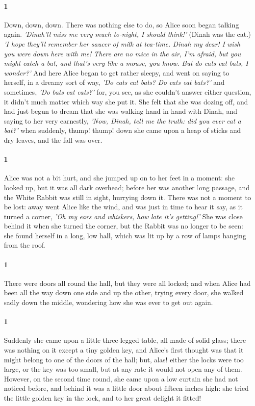 \documentclass[12pt]{article}
\begin{document}
\paragraph{1} Down, down, down. There was nothing else to do, so Alice soon began
talking again. \textit{'Dinah'll miss me very much to-night, I should think!'}
(Dinah was the cat.) \textit{'I hope they'll remember her saucer of milk at
tea-time. Dinah my dear! I wish you were down here with me! There are no
mice in the air, I'm afraid, but you might catch a bat, and that's very
like a mouse, you know. But do cats eat bats, I wonder?'} And here Alice
began to get rather sleepy, and went on saying to herself, in a dreamy
sort of way, \textit{'Do cats eat bats? Do cats eat bats?'} and sometimes, \textit{'Do
bats eat cats?'} for, you see, as she couldn't answer either question,
it didn't much matter which way she put it. She felt that she was dozing
off, and had just begun to dream that she was walking hand in hand with
Dinah, and saying to her very earnestly, \textit{'Now, Dinah, tell me the truth:
did you ever eat a bat?'} when suddenly, thump! thump! down she came upon
a heap of sticks and dry leaves, and the fall was over.


\paragraph{1} Alice was not a bit hurt, and she jumped up on to her feet in a moment:
she looked up, but it was all dark overhead; before her was another
long passage, and the White Rabbit was still in sight, hurrying down it.
There was not a moment to be lost: away went Alice like the wind, and
was just in time to hear it say, as it turned a corner, \textit{'Oh my ears
and whiskers, how late it's getting!'} She was close behind it when she
turned the corner, but the Rabbit was no longer to be seen: she found
herself in a long, low hall, which was lit up by a row of lamps hanging
from the roof.


\paragraph{1} There were doors all round the hall, but they were all locked; and when
Alice had been all the way down one side and up the other, trying every
door, she walked sadly down the middle, wondering how she was ever to
get out again.


\paragraph{1} Suddenly she came upon a little three-legged table, all made of solid
glass; there was nothing on it except a \scriptsize{tiny golden key}, and Alice's
first thought was that it might belong to one of the doors of the hall;
but, alas! either the locks were \Large{too large}, or the key was \scriptsize{too small},
but at any rate it would not open any of them. However, on the second
time round, she came upon a low curtain she had not noticed before, and
behind it was a little door about fifteen inches high: she tried the
little golden key in the lock, and to her great delight it fitted!
\end{document}
